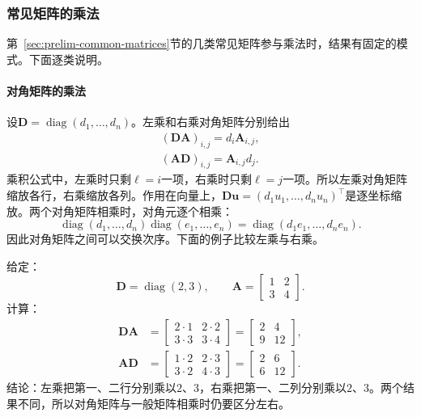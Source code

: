 \subsubsection{常见矩阵的乘法}
\label{sec:ls-common-matrix-products}

第~\ref{sec:prelim-common-matrices}节的几类常见矩阵参与乘法时，结果有固定的模式。下面逐类说明。

\paragraph{对角矩阵的乘法}
设$\bm D=\operatorname{diag}(d_1,\ldots,d_n)$。左乘和右乘对角矩阵分别给出
\[
 \begin{gathered}
(\bm D\bm A)_{i,j}=d_i\bm A_{i,j},\\
(\bm A\bm D)_{i,j}=\bm A_{i,j}d_j.
 \end{gathered}
\]
乘积公式中，左乘时只剩$\ell=i$一项，右乘时只剩$\ell=j$一项。所以左乘对角矩阵缩放各行，右乘缩放各列。作用在向量上，$\bm D\bm u=(d_1u_1,\ldots,d_nu_n)^\top$是逐坐标缩放。两个对角矩阵相乘时，对角元逐个相乘：
\[
 \operatorname{diag}(d_1,\ldots,d_n)\operatorname{diag}(e_1,\ldots,e_n)=\operatorname{diag}(d_1e_1,\ldots,d_ne_n).
\]
因此对角矩阵之间可以交换次序。下面的例子比较左乘与右乘。
\begin{example}[左乘与右乘对角矩阵]
\label{ex:ls-diagonal-scaling}
给定：
\[
\bm D=\operatorname{diag}(2,3),\qquad
\bm A=\begin{bmatrix}1&2\\3&4\end{bmatrix}.
\]
计算：
\[
 \begin{aligned}
 \bm D\bm A&=\begin{bmatrix}2\cdot1&2\cdot2\\3\cdot3&3\cdot4\end{bmatrix}=\begin{bmatrix}2&4\\9&12\end{bmatrix},\\
 \bm A\bm D&=\begin{bmatrix}1\cdot2&2\cdot3\\3\cdot2&4\cdot3\end{bmatrix}=\begin{bmatrix}2&6\\6&12\end{bmatrix}.
 \end{aligned}
\]
结论：左乘把第一、二行分别乘以$2$、$3$，右乘把第一、二列分别乘以$2$、$3$。两个结果不同，所以对角矩阵与一般矩阵相乘时仍要区分左右。
\end{example}

